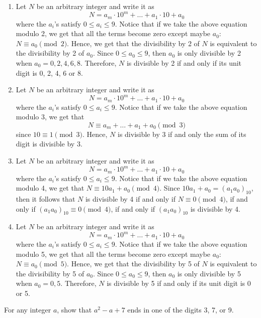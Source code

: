 \begin{solution}
    \begin{enumerate}
        \item Let $N$ be an arbitrary integer and write it as
        $$N = a_m \cdot 10^m + \dots + a_1 \cdot 10 + a_0$$
        where the $a_i$'s satisfy $0 \leq a_i \leq 9$. Notice that if we take the above equation modulo 2, we get that all the terms become zero except maybe $a_0$: $N \equiv a_0 \pmod{2}$. Hence, we get that the divisibility by 2 of $N$ is equivalent to the divisibility by 2 of $a_0$. Since $0 \leq a_0 \leq 9$, then $a_0$ is only divisible by 2 when $a_0 = 0,2,4,6,8$. Therefore, $N$ is divisible by 2 if and only if its unit digit is 0, 2, 4, 6 or 8.
        \item Let $N$ be an arbitrary integer and write it as
        $$N = a_m \cdot 10^m + \dots + a_1 \cdot 10 + a_0$$
        where the $a_i$'s satisfy $0 \leq a_i \leq 9$. Notice that if we take the above equation modulo 3, we get that
        $$N \equiv a_m + \dots + a_1 + a_0 \pmod 3$$
        since $10 \equiv 1 \pmod 3$. Hence, $N$ is divisible by 3 if and only the sum of its digit is divisible by 3.
        \item Let $N$ be an arbitrary integer and write it as
        $$N = a_m \cdot 10^m + \dots + a_1 \cdot 10 + a_0$$
        where the $a_i$'s satisfy $0 \leq a_i \leq 9$. Notice that if we take the above equation modulo 4, we get that $N \equiv 10a_1 + a_0 \pmod 4$. Since $10a_1 + a_0 = (a_1a_0)_{10}$, then it follows that $N$ is divisible by 4 if and only if $N \equiv 0 \pmod 4$, if and only if $(a_1a_0)_{10} \equiv 0 \pmod 4$, if and only if $(a_1a_0)_{10}$ is divisible by 4.
        \item Let $N$ be an arbitrary integer and write it as
        $$N = a_m \cdot 10^m + \dots + a_1 \cdot 10 + a_0$$
        where the $a_i$'s satisfy $0 \leq a_i \leq 9$. Notice that if we take the above equation modulo 5, we get that all the terms become zero except maybe $a_0$: $N \equiv a_0 \pmod{5}$. Hence, we get that the divisibility by 5 of $N$ is equivalent to the divisibility by 5 of $a_0$. Since $0 \leq a_0 \leq 9$, then $a_0$ is only divisible by 5 when $a_0 = 0,5$. Therefore, $N$ is divisible by 5 if and only if its unit digit is 0 or 5.
    \end{enumerate}
\end{solution}

\begin{exercise}
    For any integer $a$, show that $a^2 -a + 7$ ends in one of the digits 3, 7, or 9. \\
\end{exercise}


